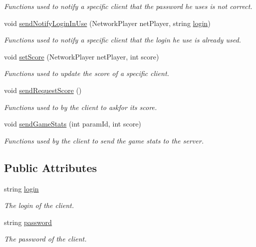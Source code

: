 \begin{DoxyCompactItemize}
\begin{DoxyCompactList}\small\item\em Functions used to notify a specific client that the password he uses is not correct.\end{DoxyCompactList}\item 
void \hyperlink{class_c3_p_o_network_manager_ab179f1b5fbab4267231dcaba8068cf7b}{send\-Notify\-Login\-In\-Use} (Network\-Player net\-Player, string \hyperlink{class_c3_p_o_network_manager_a24278174f3f3777ab191c1d174dccd8f}{login})
\begin{DoxyCompactList}\small\item\em Functions used to notify a specific client that the login he use is already used.\end{DoxyCompactList}\item 
void \hyperlink{class_c3_p_o_network_manager_a2201721623e9b5b9448c97ede484f295}{set\-Score} (Network\-Player net\-Player, int score)
\begin{DoxyCompactList}\small\item\em Functions used to update the score of a specific client.\end{DoxyCompactList}\item 
void \hyperlink{class_c3_p_o_network_manager_a554dd83d4b25f17be83ea7f315da4c8c}{send\-Request\-Score} ()
\begin{DoxyCompactList}\small\item\em Functions used to by the client to askfor its score.\end{DoxyCompactList}\item 
void \hyperlink{class_c3_p_o_network_manager_a3e62c99eb728143e919671d6feaf6574}{send\-Game\-Stats} (int param\-Id, int score)
\begin{DoxyCompactList}\small\item\em Functions used by the client to send the game stats to the server.\end{DoxyCompactList}\end{DoxyCompactItemize}
\subsection*{Public Attributes}
\begin{DoxyCompactItemize}
\item 
string \hyperlink{class_c3_p_o_network_manager_a24278174f3f3777ab191c1d174dccd8f}{login}
\begin{DoxyCompactList}\small\item\em The login of the client.\end{DoxyCompactList}\item 
string \hyperlink{class_c3_p_o_network_manager_af87fc918b29f6aed9fe932a9244e53ac}{password}
\begin{DoxyCompactList}\small\item\em The password of the client.\end{DoxyCompactList}\end{DoxyCompactItemize}
